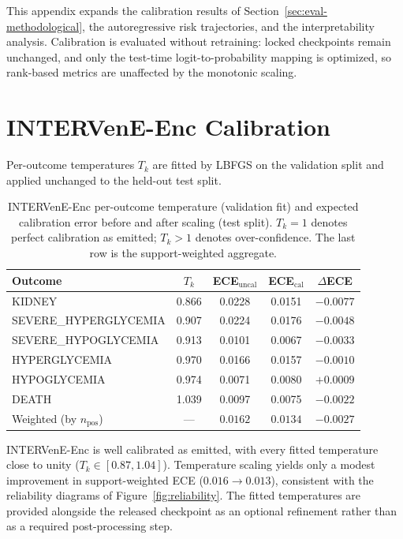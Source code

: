 This appendix expands the calibration results of Section~\ref{sec:eval-methodological}, the autoregressive risk trajectories, and the interpretability analysis. Calibration is evaluated without retraining: locked checkpoints remain unchanged, and only the test-time logit-to-probability mapping is optimized, so rank-based metrics are unaffected by the monotonic scaling.

\section{INTERVenE-Enc Calibration}
\label{app:calibration-enc}

Per-outcome temperatures $T_k$ are fitted by LBFGS on the validation split and applied unchanged to the held-out test split.

\begin{table}[htbp]
  \caption{INTERVenE-Enc per-outcome temperature (validation fit) and expected calibration error before and after scaling (test split). $T_k = 1$ denotes perfect calibration as emitted; $T_k > 1$ denotes over-confidence. The last row is the support-weighted aggregate.}
  \label{tab:calibration}
  \centering
\singlespacing
  \small
  \begin{tabular}{lcccc}
    \toprule
    Outcome & $T_k$ & ECE$_\text{uncal}$ & ECE$_\text{cal}$ & $\Delta$ECE \\
    \midrule
    KIDNEY                  & 0.866 & 0.0228 & 0.0151 & $-0.0077$ \\
    SEVERE\_HYPERGLYCEMIA   & 0.907 & 0.0224 & 0.0176 & $-0.0048$ \\
    SEVERE\_HYPOGLYCEMIA    & 0.913 & 0.0101 & 0.0067 & $-0.0033$ \\
    HYPERGLYCEMIA           & 0.970 & 0.0166 & 0.0157 & $-0.0010$ \\
    HYPOGLYCEMIA            & 0.974 & 0.0071 & 0.0080 & $+0.0009$ \\
    DEATH                   & 1.039 & 0.0097 & 0.0075 & $-0.0022$ \\
    \midrule
    Weighted (by $n_\text{pos}$) & --- & $0.0162$ & $0.0134$ & $-0.0027$ \\
    \bottomrule
  \end{tabular}
\end{table}

INTERVenE-Enc is well calibrated as emitted, with every fitted temperature close to unity ($T_k \in [0.87, 1.04]$). Temperature scaling yields only a modest improvement in support-weighted ECE ($0.016 \rightarrow 0.013$), consistent with the reliability diagrams of Figure~\ref{fig:reliability}. The fitted temperatures are provided alongside the released checkpoint as an optional refinement rather than as a required post-processing step.

